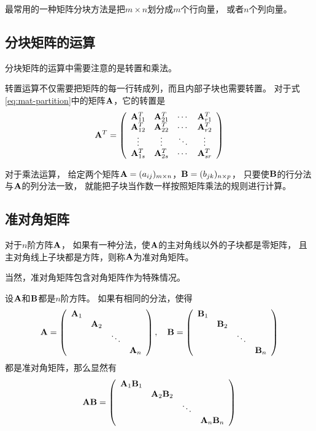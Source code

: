 最常用的一种矩阵分块方法是把$m\times n$划分成$m$个行向量，
或者$n$个列向量。

\subsection{分块矩阵的运算}
分块矩阵的运算中需要注意的是转置和乘法。

转置运算不仅需要把矩阵的每一行转成列，而且内部子块也需要转置。
对于式\ref{eq:mat-partition}中的矩阵$\mmA$，它的转置是
\[
  \mmA^T = \mmat{cccc}{
    \mmA_{11}^T & \mmA_{21}^T & \cdots & \mmA_{r1}^T \\
    \mmA_{12}^T & \mmA_{22}^T & \cdots & \mmA_{r2}^T \\
    \vdots      & \vdots      & \ddots & \vdots      \\
    \mmA_{1s}^T & \mmA_{2s}^T & \cdots & \mmA_{sr}^T }
\]

对于乘法运算，
给定两个矩阵$\mmA=(a_{ij})_{m\times n}$，$\mmB=(b_{jk})_{n\times p}$，
只要使$\mmB$的行分法与$\mmA$的列分法一致，
就能把子块当作数一样按照矩阵乘法的规则进行计算。

\subsection{准对角矩阵}
\begin{definition}[准对角矩阵] 
  对于$n$阶方阵$\mmA$，
  如果有一种分法，使$\mmA$的主对角线以外的子块都是零矩阵，
  且主对角线上子块都是方阵，则称$\mmA$为准对角矩阵。
\end{definition}

\begin{remark}
  当然，准对角矩阵包含对角矩阵作为特殊情况。
\end{remark}


设$\mmA$和$\mmB$都是$n$阶方阵。
如果有相同的分法，使得
\[
\mmA = \mmat{cccc}{
  \mmA_1 &        &        & \\
         & \mmA_2 &        & \\
         &        & \ddots & \\
         &        &        & \mmA_n },\quad
\mmB = \mmat{cccc}{
  \mmB_1 &        &        & \\
         & \mmB_2 &        & \\
         &        & \ddots & \\
         &        &        & \mmB_n }
\]
都是准对角矩阵，那么显然有
\[
\mmA\mmB = \mmat{cccc}{
    \mmA_1\mmB_1 &              &        & \\
                 & \mmA_2\mmB_2 &        & \\
                 &              & \ddots & \\
                 &              &        & \mmA_n\mmB_n }
\]

